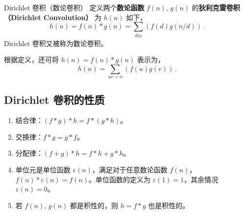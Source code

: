 
\begin{definition}{Dirichlet 卷积（数论卷积）}
定义两个\textbf{数论函数} $f(n)$, $g(n)$ 的\textbf{狄利克雷卷积（Dirichlet Convolution）} 为 $h(n)$ 如下，
\begin{equation}
h(n) = f(n) * g(n) = \sum_{d|n}\left(f(d) g(n/d)\right) ~.
\end{equation}
Dirichlet 卷积又被称为数论卷积。
\end{definition}
根据定义，还可将 $h(n) = f(n) * g(n)$ 表示为，
\begin{equation}
h(n) = \sum_{uv = n} (f(u) g(v)) ~.
\end{equation}

\subsection{Dirichlet 卷积的性质}
\begin{enumerate}
\item 结合律：$(f*g)*h = f*(g*h)$。
\item 交换律：$f*g = g*f$。
\item 分配律：$(f+g)*h = f*h + g*h$。
\item 单位元是单位函数 $\varepsilon(n)$，满足对于任意数论函数 $f(n)$，$f(n)*\varepsilon(n) = f(n)$。单位函数的定义为 $\varepsilon(1)=1$，其余情况 $\varepsilon(n) = 0$。
\item 若 $f(n)$, $g(n)$ 都是积性的，则 $h = f*g$ 也是积性的。
\end{enumerate}
